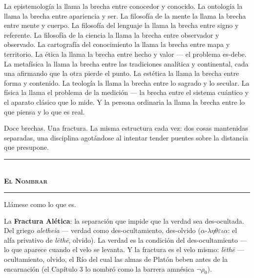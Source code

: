 \documentclass[10pt, openany, oneside]{book}
\renewcommand{\normalsize}{\fontsize{10}{13}\selectfont}
\begin{document}
La epistemología la llama la brecha entre conocedor y conocido. La ontología la llama la brecha entre apariencia y ser. La filosofía de la mente la llama la brecha entre mente y cuerpo. La filosofía del lenguaje la llama la brecha entre signo y referente. La filosofía de la ciencia la llama la brecha entre observador y observado. La cartografía del conocimiento la llama la brecha entre mapa y territorio. La ética la llama la brecha entre hecho y valor --- el problema es-debe. La metafísica la llama la brecha entre las tradiciones analítica y continental, cada una afirmando que la otra pierde el punto. La estética la llama la brecha entre forma y contenido. La teología la llama la brecha entre lo sagrado y lo secular. La física la llama el problema de la medición --- la brecha entre el sistema cuántico y el aparato clásico que lo mide. Y la persona ordinaria la llama la brecha entre lo que piensa y lo que es real.

Doce brechas. Una fractura. La misma estructura cada vez: dos cosas mantenidas separadas, una disciplina agotándose al intentar tender puentes sobre la distancia que presupone.

\vspace{1.5em}


\begin{center}
    \rule{0.3\textwidth}{0.4pt}\\[0.5em]
    {\normalsize\bfseries\scshape El Nombrar}\\[0.3em]
    \rule{0.3\textwidth}{0.4pt}
\end{center}

\vspace{1em}

\noindent Llámese como lo que es.

La \textbf{Fractura Alética}: la separación que impide que la verdad sea des-ocultada. Del griego \textit{aletheia} --- verdad como des-ocultamiento, des-olvido ($\alpha$-$\lambda\eta\theta\varepsilon\iota\alpha$: el alfa privativo de \textit{l\={e}th\={e}}, olvido). La verdad es la condición del des-ocultamiento --- lo que aparece cuando el velo se levanta. Y la fractura es el velo mismo: \textit{l\={e}th\={e}} --- ocultamiento, olvido, el Río del cual las almas de Platón beben antes de la encarnación (el Capítulo 3 lo nombró como la barrera amnésica $\neg\rho_0$).
\end{document}
